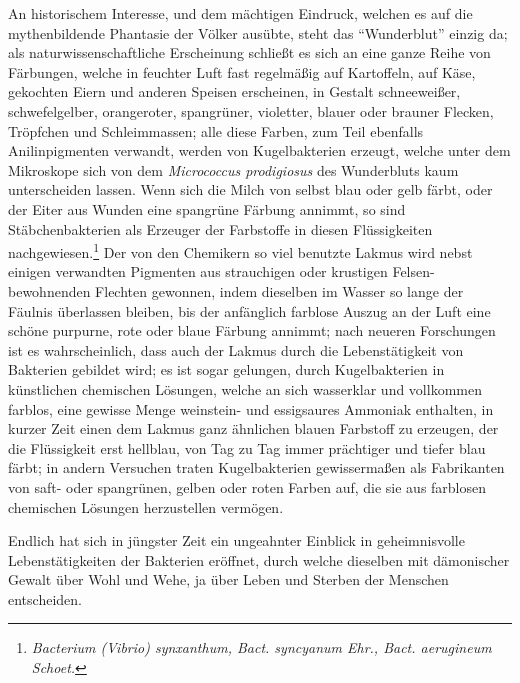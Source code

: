\documentclass[a4paper, 11pt, oneside, english]{article}
\begin{document}
An historischem Interesse, und dem mächtigen Eindruck, welchen es auf die mythenbildende Phantasie der Völker ausübte, steht das "`Wunderblut"' einzig da; als naturwissenschaftliche Erscheinung schließt es sich an eine ganze Reihe von Färbungen, welche in feuchter Luft fast regelmäßig auf Kartoffeln, auf Käse, gekochten Eiern und anderen Speisen erscheinen, in Gestalt schneeweißer, schwefelgelber, orangeroter, spangrüner, violetter, blauer oder brauner Flecken, Tröpfchen und Schleimmassen; alle diese Farben, zum Teil ebenfalls Anilinpigmenten verwandt, werden von Kugelbakterien erzeugt, welche unter dem Mikroskope sich von dem \emph{Micrococcus prodigiosus} des Wunderbluts kaum unterscheiden lassen. Wenn sich die Milch von selbst blau oder gelb färbt, oder der Eiter aus Wunden eine spangrüne Färbung annimmt, so sind Stäbchenbakterien als Erzeuger der Farbstoffe in diesen Flüssigkeiten nachgewiesen.\footnote{\emph{Bacterium (Vibrio) synxanthum, Bact. syncyanum Ehr., Bact. aerugineum Schoet.}} Der von den Chemikern so viel benutzte Lakmus wird nebst einigen verwandten Pigmenten aus strauchigen oder krustigen Felsen-bewohnenden Flechten gewonnen, indem dieselben im Wasser so lange der Fäulnis überlassen bleiben, bis der anfänglich farblose Auszug an der Luft eine schöne purpurne, rote oder blaue Färbung annimmt; nach neueren Forschungen ist es wahrscheinlich, dass auch der Lakmus durch die Lebenstätigkeit von Bakterien gebildet wird; es ist sogar gelungen, durch Kugelbakterien in künstlichen chemischen Lösungen, welche an sich wasserklar und vollkommen farblos, eine gewisse Menge weinstein- und essigsaures Ammoniak enthalten, in kurzer Zeit einen dem Lakmus ganz ähnlichen blauen Farbstoff zu erzeugen, der die Flüssigkeit erst hellblau, von Tag zu Tag immer prächtiger und tiefer blau färbt; in andern Versuchen traten Kugelbakterien gewissermaßen als Fabrikanten von saft- oder spangrünen, gelben oder roten Farben auf, die sie aus farblosen chemischen Lösungen herzustellen vermögen.

Endlich hat sich in jüngster Zeit ein ungeahnter Einblick in geheimnisvolle Lebenstätigkeiten der Bakterien eröffnet, durch welche dieselben mit dämonischer Gewalt über Wohl und Wehe, ja über Leben und Sterben der Menschen entscheiden.
\end{document}
